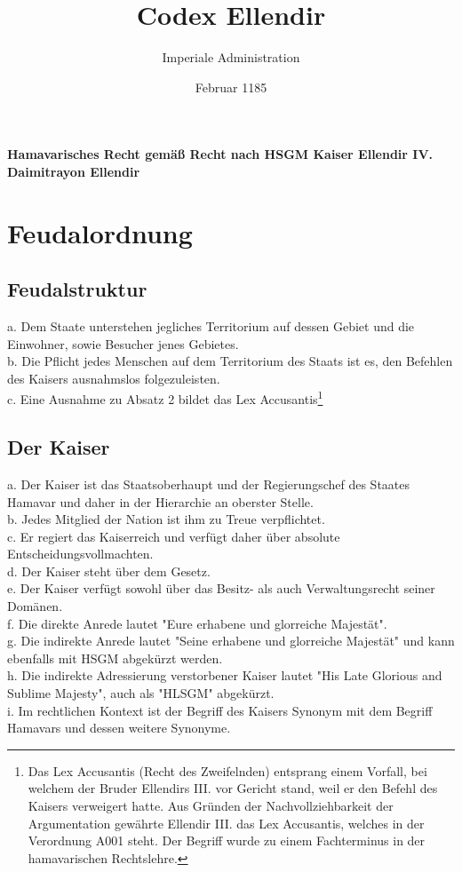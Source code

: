 \documentclass{article}
\title{Codex Ellendir}
\author{Imperiale Administration}
\date{Februar 1185}
\begin{document}
\maketitle
\vspace*{\fill}
\paragraph{Hamavarisches Recht gemäß Recht nach HSGM Kaiser Ellendir IV. Daimitrayon Ellendir}

\newpage
\section{Feudalordnung}
\subsection{Feudalstruktur}
a.  Dem Staate unterstehen jegliches Territorium auf dessen Gebiet und die Einwohner, sowie Besucher jenes Gebietes.\\
b. Die Pflicht jedes Menschen auf dem Territorium des Staats ist es, den Befehlen des Kaisers ausnahmslos folgezuleisten.\\
c. Eine Ausnahme zu Absatz 2 bildet das Lex Accusantis\footnote{Das Lex Accusantis (Recht des Zweifelnden) entsprang einem Vorfall, bei welchem der Bruder Ellendirs III. vor Gericht stand, weil er den Befehl des Kaisers verweigert hatte. Aus Gründen der Nachvollziehbarkeit der Argumentation gewährte Ellendir III. das Lex Accusantis, welches in der Verordnung A001 steht. Der Begriff wurde zu einem Fachterminus in der hamavarischen Rechtslehre.}

\subsection{Der Kaiser}
a. Der Kaiser ist das Staatsoberhaupt und der Regierungschef des Staates Hamavar und daher in der Hierarchie an oberster Stelle. \\ 
b. Jedes Mitglied der Nation ist ihm zu Treue verpflichtet.\\
c. Er regiert das Kaiserreich und verfügt daher über absolute Entscheidungsvollmachten.\\
d. Der Kaiser steht über dem Gesetz.\\
e. Der Kaiser verfügt sowohl über das Besitz- als auch Verwaltungsrecht seiner Domänen.\\
f. Die direkte Anrede lautet "Eure erhabene und glorreiche Majestät".\\
g. Die indirekte Anrede lautet "Seine erhabene und glorreiche Majestät" und kann ebenfalls mit HSGM abgekürzt werden.\\
h. Die indirekte Adressierung verstorbener Kaiser lautet "His Late Glorious and Sublime Majesty", auch als "HLSGM" abgekürzt.\\
i. Im rechtlichen Kontext ist der Begriff des Kaisers Synonym mit dem Begriff Hamavars und dessen weitere Synonyme.
\end{document}
